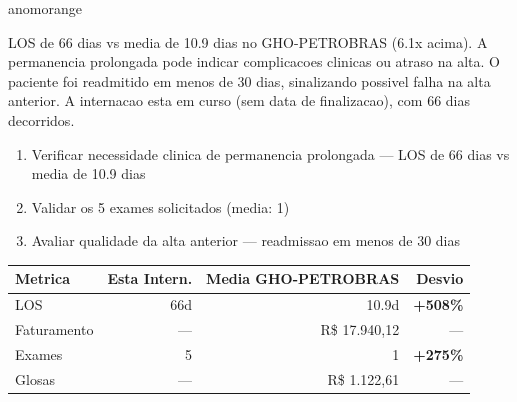 \documentclass[a4paper,10pt]{article}
\begin{document}
\begin{anomalycard}[Internacao 162348 | GHO-PETROBRAS | ALTO (z=3.72)]{anomorange}
\vspace{2pt}\begin{tcolorbox}[colback=severityred!20,colframe=anomorange,title={\textbf{Interpretacao de Negocio}},fonttitle=\bfseries\small,left=4pt,right=4pt,top=3pt,bottom=3pt]
{\small LOS de 66 dias vs media de 10.9 dias no GHO-PETROBRAS (6.1x acima). A permanencia prolongada pode indicar complicacoes clinicas ou atraso na alta. O paciente foi readmitido em menos de 30 dias, sinalizando possivel falha na alta anterior. A internacao esta em curso (sem data de finalizacao), com 66 dias decorridos.}
\end{tcolorbox}
\begin{tcolorbox}[colback=severityyellow!30,colframe=anomorange,title={\textbf{Recomendacoes Especificas}},fonttitle=\bfseries\small,left=4pt,right=4pt,top=3pt,bottom=3pt]
\begin{enumerate}[nosep,leftmargin=16pt]
\item {\small Verificar necessidade clinica de permanencia prolongada --- LOS de 66 dias vs media de 10.9 dias}
\item {\small Validar os 5 exames solicitados (media: 1)}
\item {\small Avaliar qualidade da alta anterior --- readmissao em menos de 30 dias}
\end{enumerate}
\end{tcolorbox}
\begin{center}\begin{tabular}{l r r r}\toprule\textbf{Metrica} & \textbf{Esta Intern.} & \textbf{Media GHO-PETROBRAS} & \textbf{Desvio} \\\midrule
LOS & 66d & 10.9d & \textcolor{anomred}{\textbf{+508\%}} \\
Faturamento & --- & R\$ 17.940,12 & --- \\
Exames & 5 & 1 & \textcolor{anomred}{\textbf{+275\%}} \\
Glosas & --- & R\$ 1.122,61 & --- \\
\bottomrule\end{tabular}\end{center}


\end{anomalycard}
\end{document}
